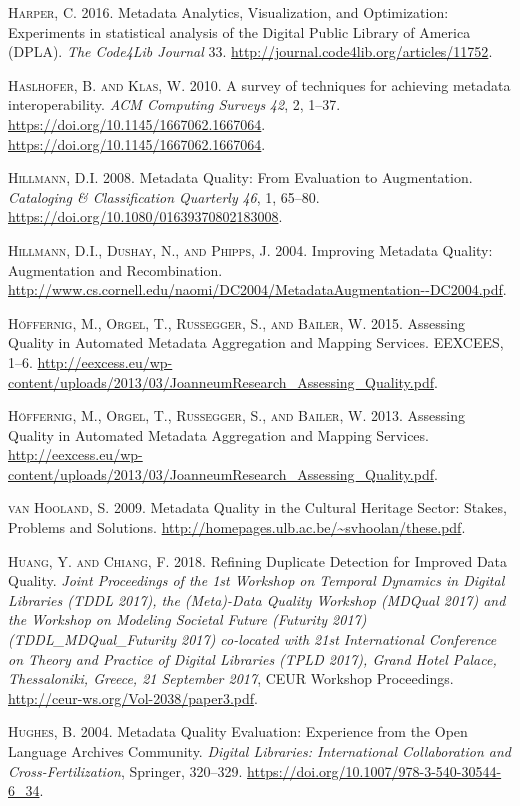 \textsc{Harper, C.} 2016. Metadata Analytics, Visualization, and Optimization: Experiments in statistical analysis of the Digital Public Library of America (DPLA). \emph{The Code4Lib Journal} 33. \url{http://journal.code4lib.org/articles/11752}.

\textsc{Haslhofer, B. and Klas, W.} 2010. A survey of techniques for achieving metadata interoperability. \emph{ACM Computing Surveys} \emph{42}, 2, 1–37. \url{https://doi.org/10.1145/1667062.1667064}. \url{https://doi.org/10.1145/1667062.1667064}.

\textsc{Hillmann, D.I.} 2008. Metadata Quality: From Evaluation to Augmentation. \emph{Cataloging \& Classification Quarterly} \emph{46}, 1, 65–80. \url{https://doi.org/10.1080/01639370802183008}.

\textsc{Hillmann, D.I., Dushay, N., and Phipps, J.} 2004. Improving Metadata Quality: Augmentation and Recombination. \url{http://www.cs.cornell.edu/naomi/DC2004/MetadataAugmentation--DC2004.pdf}.

\textsc{Höffernig, M., Orgel, T., Russegger, S., and Bailer, W.} 2015. Assessing Quality in Automated Metadata Aggregation and Mapping Services. EEXCEES, 1–6. \url{http://eexcess.eu/wp-content/uploads/2013/03/JoanneumResearch_Assessing_Quality.pdf}.

\textsc{Höffernig, M., Orgel, T., Russegger, S., and Bailer, W.} 2013. Assessing Quality in Automated Metadata Aggregation and Mapping Services. \url{http://eexcess.eu/wp-content/uploads/2013/03/JoanneumResearch_Assessing_Quality.pdf}.

\textsc{van Hooland, S.} 2009. Metadata Quality in the Cultural Heritage Sector: Stakes, Problems and Solutions. \url{http://homepages.ulb.ac.be/~svhoolan/these.pdf}.

\textsc{Huang, Y. and Chiang, F.} 2018. Refining Duplicate Detection for Improved Data Quality. \emph{Joint Proceedings of the 1st Workshop on Temporal Dynamics in Digital Libraries (TDDL 2017), the (Meta)-Data Quality Workshop (MDQual 2017) and the Workshop on Modeling Societal Future (Futurity 2017) (TDDL\_MDQual\_Futurity 2017) co-located with 21st International Conference on Theory and Practice of Digital Libraries (TPLD 2017), Grand Hotel Palace, Thessaloniki, Greece, 21 September 2017}, CEUR Workshop Proceedings. \url{http://ceur-ws.org/Vol-2038/paper3.pdf}.

\textsc{Hughes, B.} 2004. Metadata Quality Evaluation: Experience from the Open Language Archives Community. \emph{Digital Libraries: International Collaboration and Cross-Fertilization}, Springer, 320–329. \url{https://doi.org/10.1007/978-3-540-30544-6_34}.

